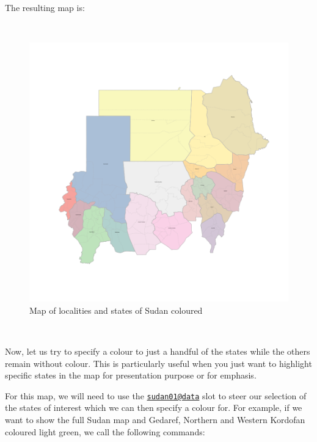 \documentclass[12pt,a4paper,a4paper]{book}
\theoremstyle{definition}
\theoremstyle{definition}
\theoremstyle{definition}
\theoremstyle{remark}
\begin{document}
\newpage

The resulting map is:

~

\begin{figure}[H]

{\centering \includegraphics{figures/map9-1} 

}

\caption{Map of localities and states of Sudan coloured }\label{fig:map9}
\end{figure}

~

Now, let us try to specify a colour to just a handful of the states
while the others remain without colour. This is particularly useful when
you just want to highlight specific states in the map for presentation
purpose or for emphasis.

For this map, we will need to use the
\href{mailto:sudan01@data}{\nolinkurl{sudan01@data}} slot to steer our
selection of the states of interest which we can then specify a colour
for. For example, if we want to show the full Sudan map and Gedaref,
Northern and Western Kordofan coloured light green, we call the
following commands:

~
\end{document}
